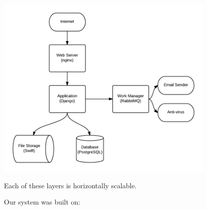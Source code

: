\documentclass[12pt,a4paper,twosided]{article}
\begin{document}
\includegraphics[width=0.8\textwidth]{./tech-overview.png}

Each of these layers is horizontally scalable.

Our system was built on:
\end{document}

